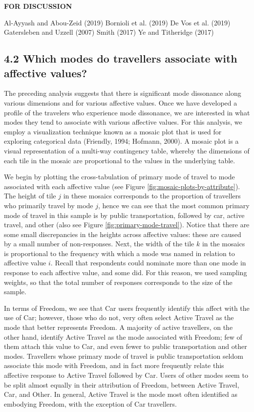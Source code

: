 \documentclass[]{elsarticle} %
\begin{document}
\textbf{FOR DISCUSSION}

Al-Ayyash and Abou-Zeid (2019) Bornioli et al. (2019) De Vos et al.
(2019) Gatersleben and Uzzell (2007) Smith (2017) Ye and Titheridge
(2017)

\hypertarget{which-modes-do-travellers-associate-with-affective-values}{%
\subsection{4.2 Which modes do travellers associate with affective
values?}\label{which-modes-do-travellers-associate-with-affective-values}}

The preceding analysis suggests that there is significant mode
dissonance along various dimensions and for various affective values.
Once we have developed a profile of the travelers who experience mode
dissonance, we are interested in what modes they tend to associate with
various affective values. For this analysis, we employ a visualization
technique known as a mosaic plot that is used for exploring categorical
data (Friendly, 1994; Hofmann, 2000). A mosaic plot is a visual
representation of a multi-way contingency table, whereby the dimensions
of each tile in the mosaic are proportional to the values in the
underlying table.

We begin by plotting the cross-tabulation of primary mode of travel to
mode associated with each affective value (see Figure
\ref{fig:mosaic-plots-by-attribute}). The height of tile \(j\) in these
mosaics corresponds to the proportion of travellers who primarily travel
by mode \(j\), hence we can see that the most common primary mode of
travel in this sample is by public transportation, followed by car,
active travel, and other (also see Figure
\ref{fig:primary-mode-travel}). Notice that there are some small
discrepancies in the heights across affective values: these are caused
by a small number of non-responses. Next, the width of the tile \(k\) in
the mosaics is proportional to the frequency with which a mode was named
in relation to affective value \(i\). Recall that respondents could
nominate more than one mode in response to each affective value, and
some did. For this reason, we used sampling weights, so that the total
number of responses corresponds to the size of the sample.

In terms of Freedom, we see that Car users frequently identify this
affect with the use of Car; however, those who do not, very often select
Active Travel as the mode that better represents Freedom. A majority of
active travellers, on the other hand, identify Active Travel as the mode
associated with Freedom; few of them attach this value to Car, and even
fewer to public transportation and other modes. Travellers whose primary
mode of travel is public transportation seldom associate this mode with
Freedom, and in fact more frequently relate this affective response to
Active Travel followed by Car. Users of other modes seem to be split
almost equally in their attribution of Freedom, between Active Travel,
Car, and Other. In general, Active Travel is the mode most often
identified as embodying Freedom, with the exception of Car travellers.
\end{document}
